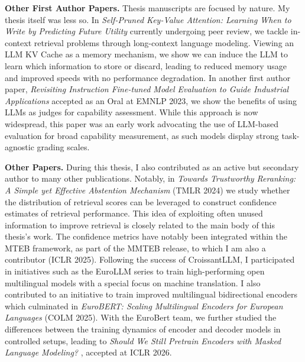 \noindent\textbf{Other First Author Papers.} Thesis manuscripts are focused by nature. My thesis itself was less so. In \emph{Self-Pruned Key-Value Attention: Learning When to Write by Predicting Future Utility}  currently undergoing peer review, we tackle in-context retrieval problems through long-context language modeling. Viewing an LLM KV Cache as a memory mechanism, we show we can induce the LLM to learn which information to store or discard, leading to reduced memory usage and improved speeds with no performance degradation. In another first author paper, \emph{Revisiting Instruction Fine-tuned Model Evaluation to Guide Industrial Applications}  accepted as an Oral at EMNLP 2023, we show the benefits of using LLMs as judges for capability assessment. While this approach is now widespread, this paper was an early work advocating the use of LLM-based evaluation for broad capability measurement, as such models display strong task-agnostic grading scales.



\noindent\textbf{Other Papers.} During this thesis, I also contributed as an active but secondary author to many other publications. Notably, in \emph{Towards Trustworthy Reranking: A Simple yet Effective Abstention Mechanism}  (TMLR 2024) we study whether the distribution of retrieval scores can be leveraged to construct confidence estimates of retrieval performance. This idea of exploiting often unused information to improve retrieval is closely related to the main body of this thesis's work. The confidence metrics have notably been integrated within the MTEB framework, as part of the MMTEB  release, to which I am also a contributor (ICLR 2025). Following the success of CroissantLLM, I participated in initiatives such as the EuroLLM series  to train high-performing open multilingual models with a special focus on machine translation. I also contributed to an initiative to train improved multilingual bidirectional encoders which culminated in \emph{EuroBERT: Scaling Multilingual Encoders for European Languages}  (COLM 2025). With the EuroBert team, we further studied the differences between the training dynamics of encoder and decoder models in controlled setups, leading to \emph{Should We Still Pretrain Encoders with Masked Language Modeling?} , accepted at ICLR 2026.

